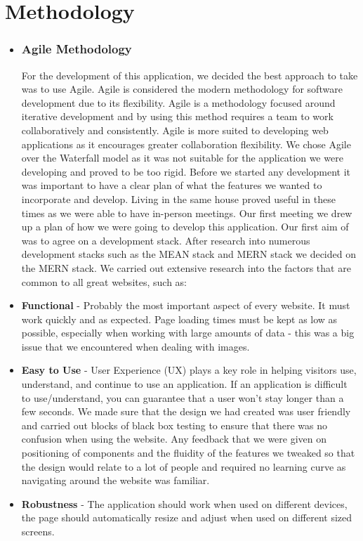 \chapter{Methodology}
\begin{itemize}
\item 

\subsection{Agile Methodology}
For the development of this application, we decided the best approach to take was to use Agile. Agile is considered the modern methodology for software development due to its flexibility. Agile is a methodology focused around iterative development and by using this method requires a team to work collaboratively and consistently. Agile is more suited to developing web applications as it encourages greater collaboration flexibility. We chose Agile over the Waterfall model as it was not suitable for the application we were developing and proved to be too rigid. Before we started any development it was important to have a clear plan of what the features we wanted to incorporate and develop. Living in the same house proved useful in these times as we were able to have in-person meetings. Our first meeting we drew up a plan of how we were going to develop this application. Our first aim of was to agree on a development stack. After research into numerous development stacks such as the MEAN stack and MERN stack we decided on the MERN stack. We carried out extensive research into the factors that are common to all great websites, such as:

\item \textbf{Functional} - Probably the most important aspect of every website. It must work quickly and as expected. Page loading times must be kept as low as possible, especially when working with large amounts of data - this was a big issue that we encountered when dealing with images.
\item \textbf{Easy to Use} - User Experience (UX) plays a key role in helping visitors use, understand, and continue to use an application. If an application is difficult to use/understand, you can guarantee that a user won't stay longer than a few seconds. We made sure that the design we had created was user friendly and carried out blocks of black box testing to ensure that there was no confusion when using the website. Any feedback that we were given on positioning of components and the fluidity of the features we tweaked so that the design would relate to a lot of people and required no learning curve as navigating around the website was familiar.
\item \textbf{Robustness} - The application should work when used on different devices, the page should automatically resize and adjust when used on different sized screens.


\end{itemize}
